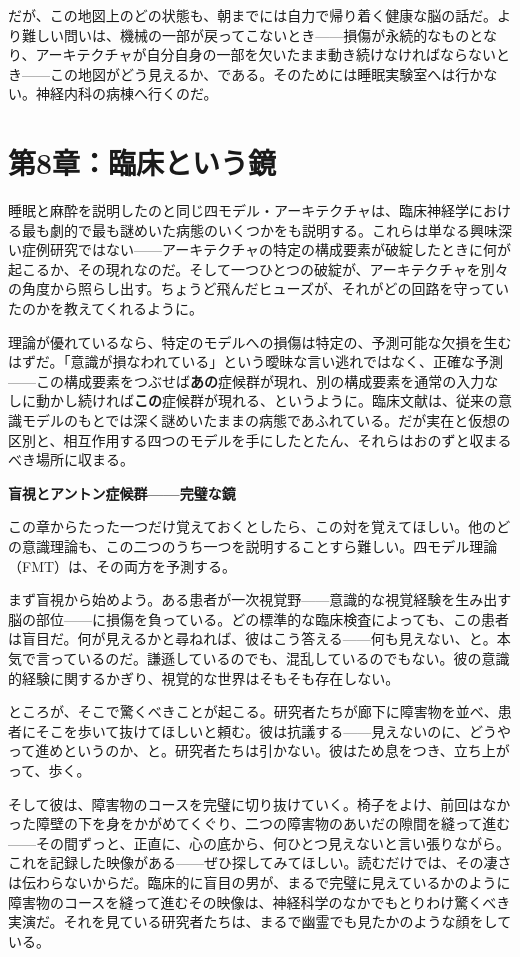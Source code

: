 \documentclass[11pt, twoside, openright]{book}
\begin{document}
だが、この地図上のどの状態も、朝までには自力で帰り着く健康な脳の話だ。より難しい問いは、機械の一部が戻ってこないとき------損傷が永続的なものとなり、アーキテクチャが自分自身の一部を欠いたまま動き続けなければならないとき------この地図がどう見えるか、である。そのためには睡眠実験室へは行かない。神経内科の病棟へ行くのだ。


\chapter*{第8章：臨床という鏡}

睡眠と麻酔を説明したのと同じ四モデル・アーキテクチャは、臨床神経学における最も劇的で最も謎めいた病態のいくつかをも説明する。これらは単なる興味深い症例研究ではない------アーキテクチャの特定の構成要素が破綻したときに何が起こるか、その現れなのだ。そして一つひとつの破綻が、アーキテクチャを別々の角度から照らし出す。ちょうど飛んだヒューズが、それがどの回路を守っていたのかを教えてくれるように。

理論が優れているなら、特定のモデルへの損傷は特定の、予測可能な欠損を生むはずだ。「意識が損なわれている」という曖昧な言い逃れではなく、正確な予測------この構成要素をつぶせば\textbf{あの}症候群が現れ、別の構成要素を通常の入力なしに動かし続ければ\textbf{この}症候群が現れる、というように。臨床文献は、従来の意識モデルのもとでは深く謎めいたままの病態であふれている。だが実在と仮想の区別と、相互作用する四つのモデルを手にしたとたん、それらはおのずと収まるべき場所に収まる。

\textbf{盲視とアントン症候群------完璧な鏡}

この章からたった一つだけ覚えておくとしたら、この対を覚えてほしい。他のどの意識理論も、この二つのうち一つを説明することすら難しい。四モデル理論（FMT）は、その両方を予測する。

まず盲視から始めよう。ある患者が一次視覚野------意識的な視覚経験を生み出す脳の部位------に損傷を負っている。どの標準的な臨床検査によっても、この患者は盲目だ。何が見えるかと尋ねれば、彼はこう答える------何も見えない、と。本気で言っているのだ。謙遜しているのでも、混乱しているのでもない。彼の意識的経験に関するかぎり、視覚的な世界はそもそも存在しない。

ところが、そこで驚くべきことが起こる。研究者たちが廊下に障害物を並べ、患者にそこを歩いて抜けてほしいと頼む。彼は抗議する------見えないのに、どうやって進めというのか、と。研究者たちは引かない。彼はため息をつき、立ち上がって、歩く。

そして彼は、障害物のコースを完璧に切り抜けていく。椅子をよけ、前回はなかった障壁の下を身をかがめてくぐり、二つの障害物のあいだの隙間を縫って進む------その間ずっと、正直に、心の底から、何ひとつ見えないと言い張りながら。これを記録した映像がある------ぜひ探してみてほしい。読むだけでは、その凄さは伝わらないからだ。臨床的に盲目の男が、まるで完璧に見えているかのように障害物のコースを縫って進むその映像は、神経科学のなかでもとりわけ驚くべき実演だ。それを見ている研究者たちは、まるで幽霊でも見たかのような顔をしている。
\end{document}
